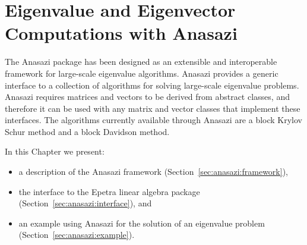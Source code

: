 % 
% 
% 
%   
%   
% 
% 

\section{Eigenvalue and Eigenvector Computations with Anasazi}
\label{chap:anasazi}

The Anasazi package has been designed as an extensible and
interoperable framework for large-scale eigenvalue algorithms. Anasazi
provides a generic interface to a collection of algorithms for solving
large-scale eigenvalue problems. Anasazi requires matrices and vectors
to be derived from abstract classes, and therefore it can be used with
any matrix and vector classes that implement these interfaces. The
algorithms currently available through Anasazi are a block Krylov
Schur method and a block Davidson method.

In this Chapter we present:
\begin{itemize}
\item a description of the Anasazi framework (Section~\ref{sec:anasazi:framework}),
\item the interface to the Epetra linear algebra package (Section~\ref{sec:anasazi:interface}), and
\item an example using Anasazi for the solution of an eigenvalue problem 
(Section~\ref{sec:anasazi:example}).
\end{itemize}

